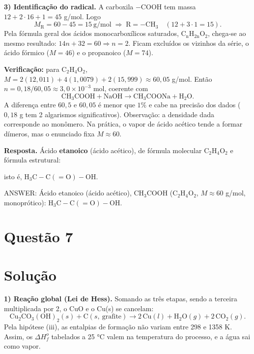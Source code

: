 \documentclass{article}%
\begin{document}
\textbf{3) Identificação do radical.}
A carboxila $-\mathrm{COOH}$ tem massa $12 + 2\cdot 16 + 1 = 45$ g/mol. Logo
\[
M_{\mathrm{R}} = 60 - 45 = 15 \ \text{g/mol} \;\Rightarrow\; \mathrm{R} = -\mathrm{CH_3}\quad(12 + 3 \cdot 1 = 15).
\]
Pela fórmula geral dos ácidos monocarboxílicos saturados, $\mathrm{C_nH_{2n}O_2}$, chega-se ao mesmo resultado: $14n + 32 = 60 \Rightarrow n = 2$. Ficam excluídos os vizinhos da série, o ácido fórmico ($M = 46$) e o propanoico ($M = 74$).

\textbf{Verificação:} para $\mathrm{C_2H_4O_2}$, $M = 2(12{,}011) + 4(1{,}0079) + 2(15{,}999) \approx 60{,}05$ g/mol. Então $n = 0{,}18/60{,}05 \approx 3{,}0 \times 10^{-3}$ mol, coerente com
\[
\mathrm{CH_3COOH + NaOH \longrightarrow CH_3COONa + H_2O}.
\]
A diferença entre $60{,}5$ e $60{,}05$ é menor que $1\%$ e cabe na precisão dos dados ($0{,}18$ g tem 2 algarismos significativos). Observação: a densidade dada corresponde ao monômero. Na prática, o vapor de ácido acético tende a formar dímeros, mas o enunciado fixa $M \approx 60$.

\textbf{Resposta.} Ácido \textbf{etanoico} (ácido acético), de fórmula molecular $\mathrm{C_2H_4O_2}$ e fórmula estrutural:
\begin{center}
\end{center}
isto é, $\mathrm{H_3C{-}C({=}O){-}OH}$.

ANSWER: Ácido etanoico (ácido acético), $\mathrm{CH_3COOH}$ ($\mathrm{C_2H_4O_2}$, $M \approx 60$ g/mol, monoprótico): $\mathrm{H_3C{-}C({=}O){-}OH}$.%
\newpage%
\section*{Questão 7}

\section*{Solução}

\textbf{1) Reação global (Lei de Hess).} Somando as três etapas, sendo a terceira multiplicada por 2, o CuO e o Cu(s) se cancelam:
\[
\text{Cu}_2\text{CO}_3(\text{OH})_2(s) + \text{C}(s,\ \text{grafite}) \longrightarrow 2\,\text{Cu}(l) + \text{H}_2\text{O}(g) + 2\,\text{CO}_2(g).
\]
Pela hipótese (iii), as entalpias de formação não variam entre 298 e 1358 K. Assim, os $\Delta H_f^o$ tabelados a 25 °C valem na temperatura do processo, e a água sai como vapor.
\end{document}
